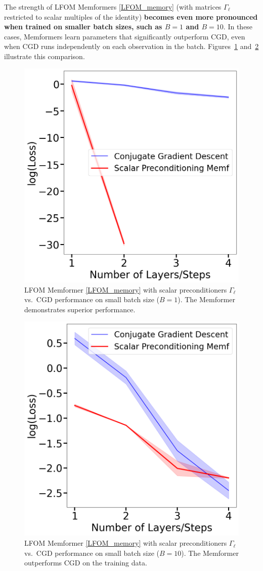 \documentclass[11pt]{article}
\theoremstyle{plain}
\theoremstyle{definition}
\theoremstyle{remark}
\numberwithin{equation}{section}
\begin{document}
The strength of LFOM Memformers \eqref{LFOM_memory} (with matrices \(\Gamma_\ell\) restricted to scalar multiples of the identity) \textbf{becomes even more pronounced when trained on smaller batch sizes, such as \( B = 1 \) and \( B = 10 \)}. In these cases, Memformers learn parameters that significantly outperform CGD, even when CGD runs independently on each observation in the batch. Figures~\ref{fig:batch_size_1} and~\ref{fig:batch_size_10} illustrate this comparison.
\begin{figure}[t]
  \centering
  \includegraphics[width=0.7\linewidth]{Batch_Size_1.png}
  \caption{LFOM Memformer \eqref{LFOM_memory} with scalar preconditioners \(\Gamma_\ell\) vs.\ CGD performance on small batch size (\( B = 1 \)). The Memformer demonstrates superior performance.}
  \label{fig:batch_size_1}
\end{figure}
\begin{figure}[t]
  \centering
  \includegraphics[width=0.7\linewidth]{Batch_Size_10.png}
  \caption{LFOM Memformer \eqref{LFOM_memory} with scalar preconditioners \(\Gamma_\ell\) vs.\ CGD performance on small batch size (\( B = 10 \)). The Memformer outperforms CGD on the training data.}
  \label{fig:batch_size_10}
\end{figure}
\end{document}
